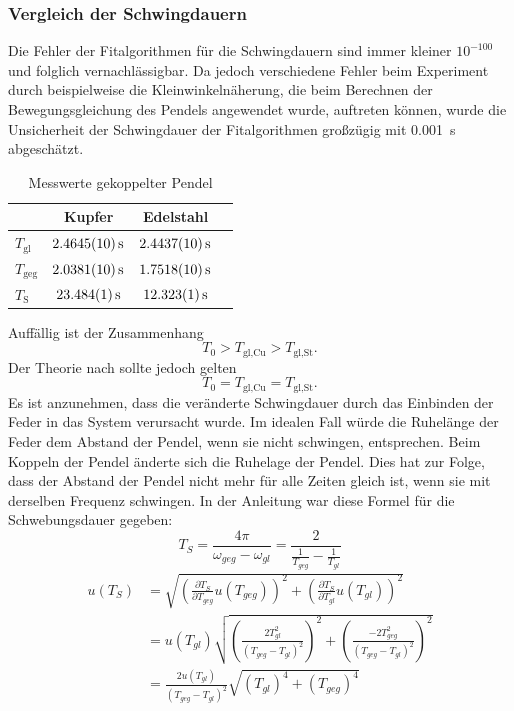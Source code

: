 \documentclass[
	a4paper,
	12pt,
	pagesize,
	ngerman
]{scrartcl}
\begin{document}
	\subsubsection{Vergleich der Schwingdauern}
	\label{Vergleich der Schwingdauern}
	Die Fehler der Fitalgorithmen für die Schwingdauern sind immer kleiner $10^{-100}$ und folglich vernachlässigbar. Da jedoch verschiedene Fehler beim Experiment durch beispielweise die Kleinwinkelnäherung, die beim Berechnen der Bewegungsgleichung des Pendels angewendet wurde, auftreten können, wurde die Unsicherheit der Schwingdauer der Fitalgorithmen großzügig mit \SI{0,001}{s} abgeschätzt.
	\begin{table}[H]
	\centering
	\begin{tabular}{ l | c | c | c |}
		& Kupfer & Edelstahl  \\ \hline
		$T_\text{gl} $ &$\SI{2,4645 \pm 0,001}{s}$&$\SI{2,4437 \pm 0,001}{s}$\\  
		$T_\text{geg} $ &$\SI{2,0381 \pm 0,001}{s}$&$\SI{1,7518 \pm 0,001}{s}$\\  
		$T_\text{S} $ &$\SI{23,484 \pm 0,001}{s}$&$\SI{12,323 \pm 0,001}{s}$\\  \hline
	\end{tabular}
	\caption{Messwerte gekoppelter Pendel}
	\end{table}
	Auffällig ist der Zusammenhang
	\begin{equation}
		T_0 >  T_\text{gl,Cu} > T_\text{gl,St}.
	\end{equation}
	Der Theorie nach sollte jedoch gelten 
	\begin{equation}
		T_0 =  T_\text{gl,Cu} = T_\text{gl,St}.
	\end{equation}
	Es ist anzunehmen, dass die veränderte Schwingdauer durch das Einbinden der Feder in das System verursacht wurde. Im idealen Fall würde die Ruhelänge der Feder dem Abstand der Pendel, wenn sie nicht schwingen, entsprechen. Beim Koppeln der Pendel änderte sich die Ruhelage der Pendel. Dies hat zur Folge, dass der Abstand der Pendel nicht mehr für alle Zeiten gleich ist, wenn sie mit derselben Frequenz schwingen.
	\newline
	\noindent{}In der Anleitung war diese Formel für die Schwebungsdauer gegeben:
	\begin{equation}
		T_S = \frac{4\pi}{\omega_{geg}-\omega_{gl}} = \frac{2}{\frac{1}{T_{geg}} - \frac{1}{T_{gl}}}
	\end{equation}
	\begin{align}
		u(T_S) &= \sqrt{\left(\frac{\partial T_S}{\partial T_{geg}}u(T_{geg}) \right)^2 + \left(\frac{\partial T_S}{\partial T_{gl}}u(T_{gl}) \right)^2 } \\
		&= u(T_{gl})\sqrt{\left(\frac{2T_{gl}^2}{(T_{geg}-T_{gl})^2} \right)^2 + \left(\frac{-2T_{geg}^2}{(T_{geg}-T_{gl})^2} \right)^2 } \\
		&= \frac{2u(T_{gl})}{(T_{geg}-T_{gl})^2}\sqrt{(T_{gl})^4 + (T_{geg})^4 } 
	\end{align}
\end{document}
